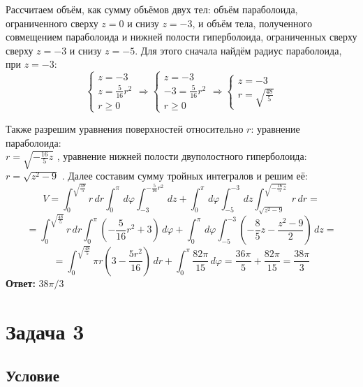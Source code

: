 \documentclass[12pt]{article}
\begin{document}
\begin{enumerate}[wide, labelwidth=!, labelindent=0pt]
		Рассчитаем объём, как сумму объёмов двух тел: объём параболоида, ограниченного сверху $ z = 0 $ и снизу $ z = -3 $, и объём тела, полученного совмещением параболоида и нижней полости гиперболоида, ограниченных сверху сверху $ z = -3 $ и снизу $ z = -5 $. Для этого сначала найдём радиус параболоида, при $ z = -3 $:
		\begin{equation*}	 
			\begin{cases}
				z = - 3\\
				z=\frac{5}{16}r^2 \\
				r \geq 0
			\end{cases}
			\Rightarrow
			\begin{cases}
				z = -3\\
				-3=\frac{5}{16}r^2 \\
				r \geq 0
			\end{cases}
			\Rightarrow
			\begin{cases}
				z = -3\\
				r=\sqrt{\frac{48}{5}}
			\end{cases}
		\end{equation*}

		Также разрешим уравнения поверхностей относительно $ r $: уравнение параболоида:\\ $r = \sqrt{-\frac{16}{5}z} $ , уравнение нижней полости двуполостного гиперболоида: $r=\sqrt{z^2-9}$ . Далее составим сумму тройных интегралов и решим её:
		$$ V = \int_{0}^{\sqrt{\frac{48}{5}}} r \, dr \int_0^\pi \, d\varphi \int_{-3}^{-\frac{5}{16}r^2} \, dz + \int_0^\pi \, d\varphi \int_{-5}^{-3} \, dz \int_{\sqrt{z^2-9}}^{\sqrt{-\frac{16}{5}z}} r \, dr = $$
		$$ = \int_{0}^{\sqrt{\frac{48}{5}}} r \, dr \int_0^\pi (-\frac{5}{16}r^2 + 3) \, d\varphi + \int_0^\pi \, d\varphi \int_{-5}^{-3} ( - \frac{8}{5}z - \frac{z^2-9}{2})  \, dz = $$
		$$ = \int_{0}^{\sqrt{\frac{48}{5}}} \pi r (3 - \frac{5 r^2}{16}) \, dr  +  \int_0^\pi \frac{82\pi}{15} \, d\varphi  = \frac{36 \pi}{5} + \frac{82\pi}{15} = \frac{38\pi}{3} $$
		\hspace{290pt}\textbf{Ответ:} $38\pi/3$	
	\end{enumerate}
	\newpage 
	
	\section*{Задача 3}	
	\subsection*{Условие}
	
\end{document}

